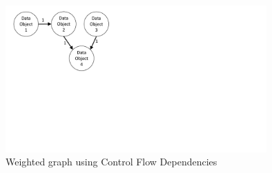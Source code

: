 \begin{figure}[h!]
	\centering
	\includegraphics[width=10cm, trim={1.5cm 9.5cm 16.0cm 0cm}]{img/DataFlowGraph.pdf}
	\caption{Weighted graph using Control Flow Dependencies}
	\label{fig:dataFlowGraph}
\end{figure}








